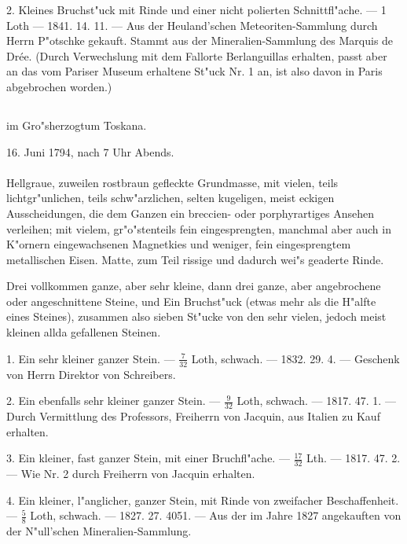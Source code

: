 \documentclass[a4paper, 11pt, oneside, polutonikogreek, german]{article}
\begin{document}
2. Kleines Bruchst"uck mit Rinde und einer nicht polierten Schnittfl"ache. --- 1 Loth --- 1841. 14. 11. --- Aus der Heuland'schen Meteoriten-Sammlung durch Herrn P"otschke gekauft. Stammt aus der Mineralien-Sammlung des Marquis de Drée. (Durch Verwechslung mit dem Fallorte Berlanguillas erhalten, passt aber an das vom Pariser Museum erhaltene St"uck Nr. 1 an, ist also davon in Paris abgebrochen worden.)
\subsection[\frakfamily{Siena.}]{}
\begin{center}

im Gro"sherzogtum Toskana.

16. Juni 1794, nach 7 Uhr Abends.
\end{center}
\paragraph{}
Hellgraue, zuweilen rostbraun gefleckte Grundmasse, mit vielen, teils lichtgr"unlichen, teils schw"arzlichen, selten kugeligen, meist eckigen Ausscheidungen, die dem Ganzen ein breccien- oder porphyrartiges Ansehen verleihen; mit vielem, gr"o"stenteils fein eingesprengten, manchmal aber auch in K"ornern eingewachsenen Magnetkies und weniger, fein eingesprengtem metallischen Eisen. Matte, zum Teil rissige und dadurch wei"s geaderte Rinde.

Drei vollkommen ganze, aber sehr kleine, dann drei ganze, aber angebrochene oder angeschnittene Steine, und Ein Bruchst"uck (etwas mehr als die H"alfte eines Steines), zusammen also sieben St"ucke von den sehr vielen, jedoch meist kleinen allda gefallenen Steinen.

1. Ein sehr kleiner ganzer Stein. --- $\frac{7}{32}$ Loth, schwach. --- 1832. 29. 4. --- Geschenk von Herrn Direktor von Schreibers.

2. Ein ebenfalls sehr kleiner ganzer Stein. --- $\frac{9}{32}$ Loth, schwach. --- 1817. 47. 1. --- Durch Vermittlung des Professors, Freiherrn von Jacquin, aus Italien zu Kauf erhalten.

3. Ein kleiner, fast ganzer Stein, mit einer Bruchfl"ache. --- $\frac{17}{32}$ Lth. --- 1817. 47. 2. --- Wie Nr. 2 durch Freiherrn von Jacquin erhalten.

4. Ein kleiner, l"anglicher, ganzer Stein, mit Rinde von zweifacher Beschaffenheit. --- $\frac{5}{8}$ Loth, schwach. --- 1827. 27. 4051. --- Aus der im Jahre 1827 angekauften von der N"ull'schen Mineralien-Sammlung.
\end{document}
